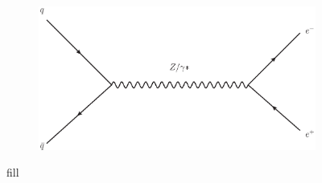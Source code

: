 \begin{figure}[!p]
    \centering
    \begin{subfigure}[b]{\SideBySidePlotWidth}
        \includegraphics[width=\linewidth]{figures/NormalDY.eps}
        \caption{}
        \label{fig:feyn_qqbar_to_zg}
    \end{subfigure}%

    \caption[
        Higher order in \alphastrong \Ztoee Feynman diagrams.
    ]{
        fill
    }
    \label{fig:LowerOrder}
\end{figure}